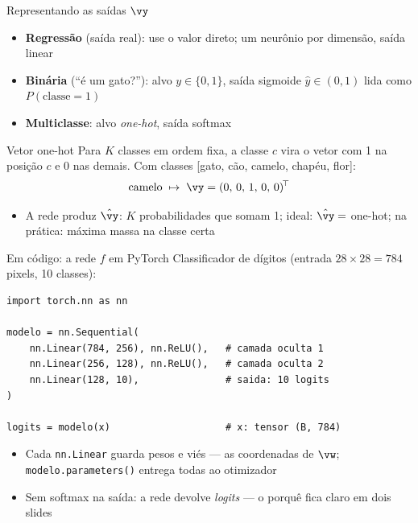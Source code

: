 \documentclass[aspectratio=169, 11pt]{beamer}
\begin{document}
\begin{frame}{Representando as saídas $\vy$}
  \begin{itemize}\setlength{\itemsep}{0.4ex}
    \item \textbf{Regressão} (saída real): use o valor direto; um neurônio por
          dimensão, saída linear
    \item \textbf{Binária} (``é um gato?''): alvo $y \in \{0, 1\}$, saída
          sigmoide $\hat{y} \in (0,1)$ lida como $P(\text{classe} = 1)$
    \item \textbf{Multiclasse}: alvo \emph{one-hot}, saída softmax
  \end{itemize}

  \begin{defbox}{Vetor one-hot}
    Para $K$ classes em ordem fixa, a classe $c$ vira o vetor com 1 na posição
    $c$ e 0 nas demais. Com classes [gato, cão, camelo, chapéu, flor]:
    \[
      \text{camelo} \;\mapsto\; \vy = (0,\, 0,\, 1,\, 0,\, 0)^{\!\top}
    \]
  \end{defbox}

  \begin{itemize}\setlength{\itemsep}{0.2ex}
    \item A rede produz $\hat{\vy}$: $K$ probabilidades que somam 1; ideal:
          $\hat{\vy} = $ one-hot; na prática: máxima massa na classe certa
  \end{itemize}
\end{frame}

\begin{frame}[fragile]{Em código: a rede $f$ em PyTorch}
  Classificador de dígitos (entrada $28 \times 28 = 784$ pixels, 10 classes):

\begin{lstlisting}
import torch.nn as nn

modelo = nn.Sequential(
    nn.Linear(784, 256), nn.ReLU(),   # camada oculta 1
    nn.Linear(256, 128), nn.ReLU(),   # camada oculta 2
    nn.Linear(128, 10),               # saida: 10 logits
)

logits = modelo(x)                    # x: tensor (B, 784)
\end{lstlisting}

  \begin{itemize}\setlength{\itemsep}{0.2ex}
    \item Cada \texttt{nn.Linear} guarda pesos e viés — as coordenadas de $\vw$;
          \texttt{modelo.parameters()} entrega todas ao otimizador
    \item \alert{Sem softmax na saída}: a rede devolve \emph{logits} —
          o porquê fica claro em dois slides
  \end{itemize}
\end{frame}
\end{document}
